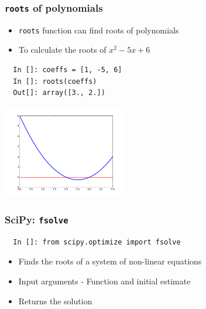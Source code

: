 \begin{frame}[fragile]
\frametitle{\texttt{roots} of polynomials}
\begin{itemize}
\item \texttt{roots} function can find roots of polynomials
\item To calculate the roots of $x^2-5x+6$ 
\end{itemize}
\begin{lstlisting}
  In []: coeffs = [1, -5, 6]
  In []: roots(coeffs)
  Out[]: array([3., 2.])
\end{lstlisting}
\vspace*{-.2in}
\begin{center}
\includegraphics[height=1.6in, interpolate=true]{images/roots}    
\end{center}
\end{frame}

\begin{frame}[fragile]
\frametitle{SciPy: \texttt{fsolve}}
\begin{small}
\begin{lstlisting}
  In []: from scipy.optimize import fsolve
\end{lstlisting}
\end{small}
\begin{itemize}
\item Finds the roots of a system of non-linear equations
\item Input arguments - Function and initial estimate
\item Returns the solution
\end{itemize}
\end{frame}

